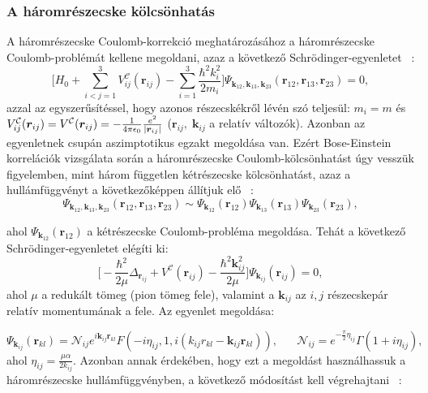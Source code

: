\documentclass[11pt,a4paper]{article}
\numberwithin{equation}{subsection}
\numberwithin{figure}{section}
\begin{document}
\subsubsection{A háromrészecske kölcsönhatás}

A háromrészecske Coulomb-korrekció meghatározásához a háromrészecske Coulomb-problémát kellene megoldani, azaz a következő Schrödinger-egyenletet ~\cite{Alt:1998nr}:
\begin{equation}
\Bigg[H_0+\sum_{i<j=1}^3V^{\mathcal{C}}_{ij}(\bm{r}_{ij})
-\sum_{i=1}^3\frac{\hbar^2 k^2_i}{2m_i}
\Bigg]\Psi_{\bm{k}_{12}, \bm{k}_{13}, \bm{k}_{23}}(\bm{r}_{12},\bm{r}_{13},\bm{r}_{23}) = 0,
\end{equation}
azzal az egyszerűsítéssel, hogy azonos részecskékről lévén szó teljesül: $m_i=m$ és $V^\mathcal{C}_{ij}(\bm{r}_{ij})=V^\mathcal{C}(\bm{r}_{ij})=-\frac{1}{4\pi\epsilon_0}\frac{e^2}{\abs{\bm{r}_{ij}}}$ ($\bm{r}_{ij},\;\bm{k}_{ij}$ a relatív változók). Azonban az egyenletnek csupán aszimptotikus egzakt megoldása van. Ezért Bose-Einstein korrelációk vizsgálata során a háromrészecske Coulomb-kölcsönhatást úgy vesszük figyelemben, mint három független kétrészecske kölcsönhatást, azaz a hullámfüggvényt a következőképpen állítjuk elő ~\cite{Alt:1998nr}:
\begin{equation}
\Psi_{\bm{k}_{12}, \bm{k}_{13}, \bm{k}_{23}}(\bm{r}_{12},\bm{r}_{13},\bm{r}_{23})  \sim
\Psi_{\bm{k}_{12}}(\bm{r}_{12})\Psi_{\bm{k}_{13}}(\bm{r}_{13})\Psi_{\bm{k}_{23}}(\bm{r}_{23}),
\end{equation}

ahol $\Psi_{\bm{k}_{12}}(\bm{r}_{12})$ a kétrészecske Coulomb-probléma megoldása. Tehát a következő Schrödinger-egyenletet elégíti ki:
\begin{equation}
\Bigg[-\frac{\hbar^2}{2\mu}\Delta_{\bm{r}_{ij}}+V^\mathcal{C}(\bm{r}_{ij})-\frac{\hbar^2 \bm{k}^2_{ij}}{2\mu}
\Bigg]\Psi_{\bm{k}_{ij}}(\bm{r}_{ij})=0,
\end{equation}
ahol $\mu$ a redukált tömeg (pion tömeg fele), valamint a $\bm{k}_{ij}$ az $i,j$ részecskepár relatív momentumának a fele. Az egyenlet megoldása:

\begin{equation}
\Psi_{\bm{k}_{ij}}(\bm{r}_{kl}) = \mathcal{N}_{ij}e^{i\bm{k}_{ij}\bm{r}_{kl}}F(-i\eta_{ij},1,i(k_{ij}r_{kl}-\bm{k}_{ij}\bm{r}_{kl})),\;\;\;\;\;\;
\mathcal{N}_{ij}=e^{-\frac{\pi}{2}\eta_{ij}}\Gamma(1+i\eta_{ij}),
\end{equation}
ahol $\eta_{ij}=\frac{\mu\alpha}{2k_{ij}}$. Azonban annak érdekében, hogy ezt a megoldást használhassuk a háromrészecske hullámfüggvényben, a következő módosítást kell végrehajtani  ~\cite{Alt:1998nr,Biyajima:2003ey, Mizoguchi:2000km}:
\end{document}
